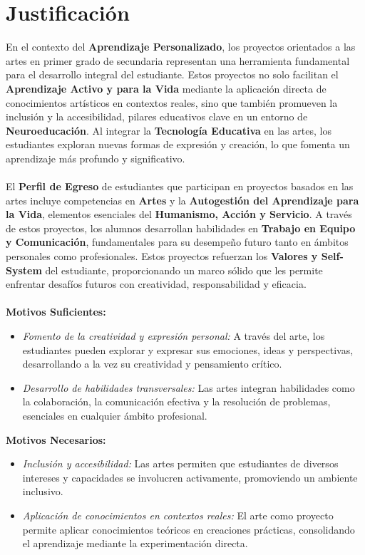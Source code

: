 \section{Justificación}
En el contexto del \textbf{Aprendizaje Personalizado}, los proyectos orientados a las artes en primer grado de secundaria representan una herramienta fundamental para el desarrollo integral del estudiante. Estos proyectos no solo facilitan el \textbf{Aprendizaje Activo y para la Vida} mediante la aplicación directa de conocimientos artísticos en contextos reales, sino que también promueven la inclusión y la accesibilidad, pilares educativos clave en un entorno de \textbf{Neuroeducación}. Al integrar la \textbf{Tecnología Educativa} en las artes, los estudiantes exploran nuevas formas de expresión y creación, lo que fomenta un aprendizaje más profundo y significativo.
\\ \\ 
El \textbf{Perfil de Egreso} de estudiantes que participan en proyectos basados en las artes incluye competencias en \textbf{Artes} y la \textbf{Autogestión del Aprendizaje para la Vida}, elementos esenciales del \textbf{Humanismo, Acción y Servicio}. A través de estos proyectos, los alumnos desarrollan habilidades en \textbf{Trabajo en Equipo y Comunicación}, fundamentales para su desempeño futuro tanto en ámbitos personales como profesionales. Estos proyectos refuerzan los \textbf{Valores y Self-System} del estudiante, proporcionando un marco sólido que les permite enfrentar desafíos futuros con creatividad, responsabilidad y eficacia.
\\ \\ 
\textbf{Motivos Suficientes:} \\
\begin{itemize}
    \item \textit{Fomento de la creatividad y expresión personal:}
    A través del arte, los estudiantes pueden explorar y expresar sus emociones, ideas y perspectivas, desarrollando a la vez su creatividad y pensamiento crítico.
    \item \textit{Desarrollo de habilidades transversales:}
    Las artes integran habilidades como la colaboración, la comunicación efectiva y la resolución de problemas, esenciales en cualquier ámbito profesional.
\end{itemize}
\textbf{Motivos Necesarios:}
\begin{itemize}
    \item \textit{Inclusión y accesibilidad:}
     Las artes permiten que estudiantes de diversos intereses y capacidades se involucren activamente, promoviendo un ambiente inclusivo.
     \item \textit{Aplicación de conocimientos en contextos reales:}
    El arte como proyecto permite aplicar conocimientos teóricos en creaciones prácticas, consolidando el aprendizaje mediante la experimentación directa.
\end{itemize}

